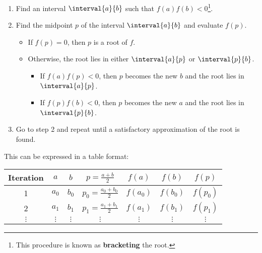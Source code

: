 \documentclass{article}
\begin{document}
\begin{enumerate}
    \item Find an interval \(\interval{a}{b}\) such that \(f\left( a
          \right) f\left( b \right) < 0\)\footnote{This procedure is
          known as \textbf{bracketing} the root.}.
    \item Find the midpoint \(p\) of the interval \(\interval{a}{b}\)
          and evaluate \(f\left( p \right)\).
          \begin{itemize}
              \item If \(f\left( p \right) = 0\), then \(p\) is a root
                    of \(f\).
              \item Otherwise, the root lies in either
                    \(\interval{a}{p}\) or \(\interval{p}{b}\).
                    \begin{itemize}
                        \item If \(f\left( a \right) f\left( p \right)
                              < 0\), then \(p\) becomes the new \(b\)
                              and the root lies in \(\interval{a}{p}\).
                        \item If \(f\left( p \right) f\left( b \right)
                              < 0\), then \(p\) becomes the new \(a\)
                              and the root lies in \(\interval{p}{b}\).
                    \end{itemize}
          \end{itemize}
    \item Go to step 2 and repeat until a satisfactory approximation of
          the root is found.
\end{enumerate}
This can be expressed in a table format:
\begin{table}[H]
    \centering
    \begin{tabular}{ccccccc}
        \toprule
        \textbf{Iteration} & \(a\)      & \(b\)      & \(p = \frac{a + b}{2}\)       & \(f\left( a \right)\)   & \(f\left( b \right)\)   & \(f\left( p \right)\)   \\
        \midrule
        1                  & \(a_0\)    & \(b_0\)    & \(p_0 = \frac{a_0 + b_0}{2}\) & \(f\left( a_0 \right)\) & \(f\left( b_0 \right)\) & \(f\left( p_0 \right)\) \\
        2                  & \(a_1\)    & \(b_1\)    & \(p_1 = \frac{a_1 + b_1}{2}\) & \(f\left( a_1 \right)\) & \(f\left( b_1 \right)\) & \(f\left( p_1 \right)\) \\
        \(\vdots\)         & \(\vdots\) & \(\vdots\) & \(\vdots\)                    & \(\vdots\)              & \(\vdots\)              & \(\vdots\)              \\
        \bottomrule
    \end{tabular}
\end{table}
\end{document}
